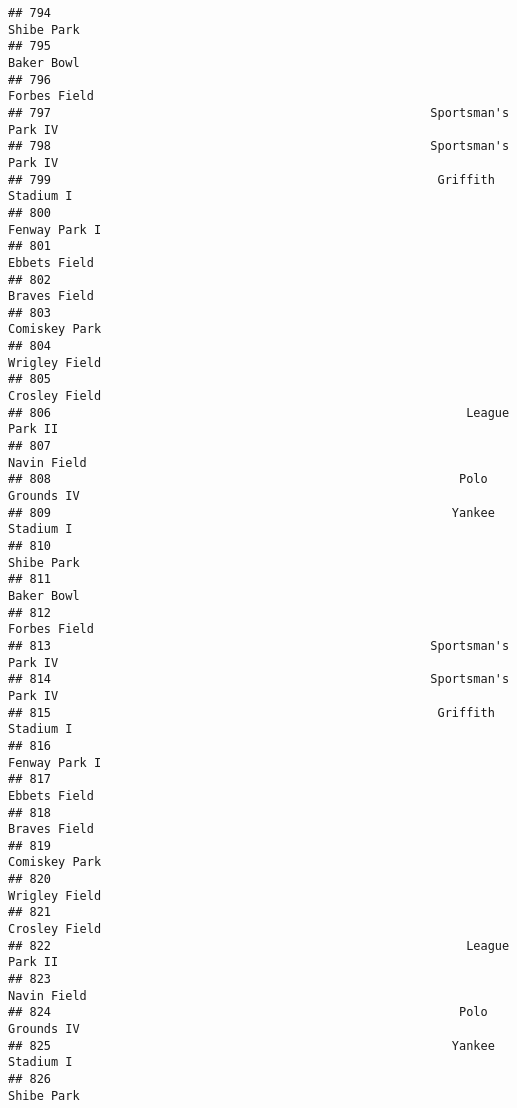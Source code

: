 \documentclass[]{article}
\begin{document}
\begin{verbatim}
## 794                                                              Shibe Park
## 795                                                              Baker Bowl
## 796                                                            Forbes Field
## 797                                                     Sportsman's Park IV
## 798                                                     Sportsman's Park IV
## 799                                                      Griffith Stadium I
## 800                                                           Fenway Park I
## 801                                                            Ebbets Field
## 802                                                            Braves Field
## 803                                                           Comiskey Park
## 804                                                           Wrigley Field
## 805                                                           Crosley Field
## 806                                                          League Park II
## 807                                                             Navin Field
## 808                                                         Polo Grounds IV
## 809                                                        Yankee Stadium I
## 810                                                              Shibe Park
## 811                                                              Baker Bowl
## 812                                                            Forbes Field
## 813                                                     Sportsman's Park IV
## 814                                                     Sportsman's Park IV
## 815                                                      Griffith Stadium I
## 816                                                           Fenway Park I
## 817                                                            Ebbets Field
## 818                                                            Braves Field
## 819                                                           Comiskey Park
## 820                                                           Wrigley Field
## 821                                                           Crosley Field
## 822                                                          League Park II
## 823                                                             Navin Field
## 824                                                         Polo Grounds IV
## 825                                                        Yankee Stadium I
## 826                                                              Shibe Park

\end{verbatim}
\end{document}
